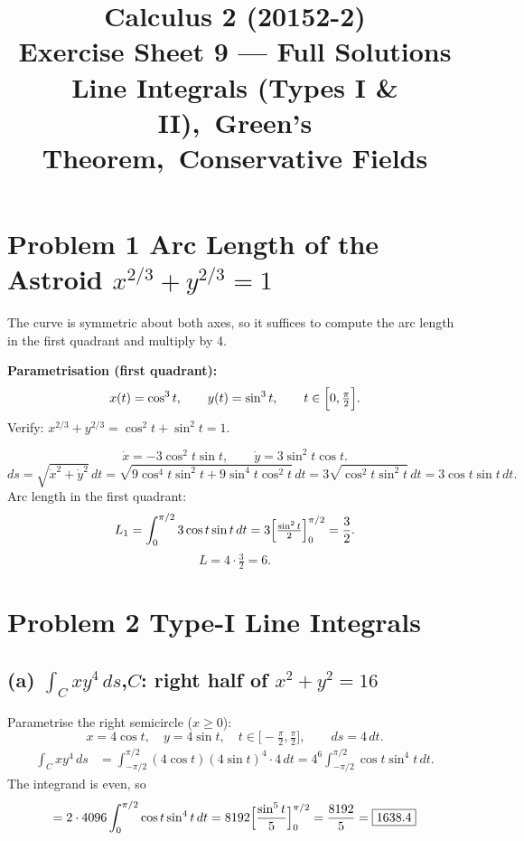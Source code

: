 \documentclass[12pt]{article}
\title{\bfseries Calculus 2 (20152-2)\\[6pt]
\large Exercise Sheet 9 --- Full Solutions\\[4pt]
\normalsize Line Integrals (Types I \& II),\ Green's Theorem,\ Conservative Fields}
\author{}
\date{}
\begin{document}
\maketitle

\section*{Problem 1 \quad Arc Length of the Astroid $x^{2/3}+y^{2/3}=1$}

The curve is symmetric about both axes, so it suffices to compute the arc length
in the first quadrant and multiply by 4.

\textbf{Parametrisation (first quadrant):}
\[
  x(t)=\cos^3 t,\qquad y(t)=\sin^3 t,\qquad t\in\Bigl[0,\tfrac{\pi}{2}\Bigr].
\]
Verify: $x^{2/3}+y^{2/3}=\cos^2 t+\sin^2 t=1$.\quad\checkmark

\[
  \dot{x}=-3\cos^2 t\sin t,\qquad \dot{y}=3\sin^2 t\cos t.
\]
\[
  ds=\sqrt{\dot{x}^2+\dot{y}^2}\,dt
    =\sqrt{9\cos^4 t\sin^2 t+9\sin^4 t\cos^2 t}\,dt
    =3\sqrt{\cos^2 t\sin^2 t}\,dt
    =3\cos t\sin t\,dt.
\]
Arc length in the first quadrant:
\[
  L_1=\int_0^{\pi/2}3\cos t\sin t\,dt
     =3\Bigl[\tfrac{\sin^2 t}{2}\Bigr]_0^{\pi/2}=\frac{3}{2}.
\]
\[
  \boxed{L=4\cdot\tfrac{3}{2}=6.}
\]

\section*{Problem 2 \quad Type-I Line Integrals}

\subsection*{(a) $\displaystyle\int_C xy^4\,ds$,\quad $C$: right half of $x^2+y^2=16$}

Parametrise the right semicircle ($x\ge0$):
\[
  x=4\cos t,\quad y=4\sin t,\quad t\in\bigl[-\tfrac{\pi}{2},\tfrac{\pi}{2}\bigr],
  \qquad ds=4\,dt.
\]
\begin{align*}
  \int_C xy^4\,ds
  &=\int_{-\pi/2}^{\pi/2}(4\cos t)(4\sin t)^4\cdot4\,dt
   =4^6\int_{-\pi/2}^{\pi/2}\cos t\sin^4 t\,dt.
\end{align*}
The integrand is even, so
\[
  =2\cdot4096\int_0^{\pi/2}\cos t\sin^4 t\,dt
   =8192\Bigl[\frac{\sin^5 t}{5}\Bigr]_0^{\pi/2}
   =\frac{8192}{5}=\boxed{1638.4}
\]
\end{document}
